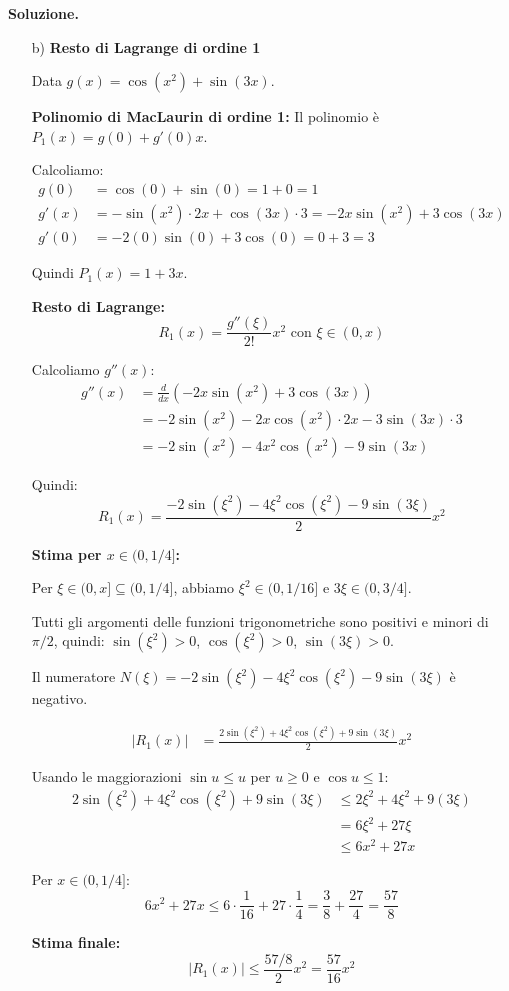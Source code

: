 \documentclass[12pt, a4paper]{article}
\newenvironment{solution}{%
    \par\noindent\textbf{Soluzione.}\medskip\par
    \normalfont
}{\par\bigskip}
\begin{document}
\begin{solution}
\begin{enumerate}
    \item[b)] \textbf{Resto di Lagrange di ordine 1}
    
    Data $g(x) = \cos(x^2) + \sin(3x)$.
    
    \textbf{Polinomio di MacLaurin di ordine 1:}
    Il polinomio è $P_1(x) = g(0) + g'(0)x$.
    
    Calcoliamo:
    \begin{align}
        g(0) &= \cos(0) + \sin(0) = 1 + 0 = 1 \\
        g'(x) &= -\sin(x^2) \cdot 2x + \cos(3x) \cdot 3 = -2x\sin(x^2) + 3\cos(3x) \\
        g'(0) &= -2(0)\sin(0) + 3\cos(0) = 0 + 3 = 3
    \end{align}
    
    Quindi $P_1(x) = 1 + 3x$.
    
    \textbf{Resto di Lagrange:}
    \[R_1(x) = \frac{g''(\xi)}{2!}x^2 \text{ con } \xi \in (0,x)\]
    
    Calcoliamo $g''(x)$:
    \begin{align}
        g''(x) &= \frac{d}{dx}(-2x\sin(x^2) + 3\cos(3x)) \\
        &= -2\sin(x^2) - 2x\cos(x^2) \cdot 2x - 3\sin(3x) \cdot 3 \\
        &= -2\sin(x^2) - 4x^2\cos(x^2) - 9\sin(3x)
    \end{align}
    
    Quindi:
    \[R_1(x) = \frac{-2\sin(\xi^2) - 4\xi^2\cos(\xi^2) - 9\sin(3\xi)}{2}x^2\]
    
    \textbf{Stima per $x \in (0, 1/4]$:}
    
    Per $\xi \in (0, x] \subseteq (0, 1/4]$, abbiamo $\xi^2 \in (0, 1/16]$ e $3\xi \in (0, 3/4]$.
    
    Tutti gli argomenti delle funzioni trigonometriche sono positivi e minori di $\pi/2$, quindi:
    $\sin(\xi^2) > 0$, $\cos(\xi^2) > 0$, $\sin(3\xi) > 0$.
    
    Il numeratore $N(\xi) = -2\sin(\xi^2) - 4\xi^2\cos(\xi^2) - 9\sin(3\xi)$ è negativo.
    
    \begin{align}
        |R_1(x)| &= \frac{2\sin(\xi^2) + 4\xi^2\cos(\xi^2) + 9\sin(3\xi)}{2}x^2
    \end{align}
    
    Usando le maggiorazioni $\sin u \leq u$ per $u \geq 0$ e $\cos u \leq 1$:
    \begin{align}
        2\sin(\xi^2) + 4\xi^2\cos(\xi^2) + 9\sin(3\xi) &\leq 2\xi^2 + 4\xi^2 + 9(3\xi) \\
        &= 6\xi^2 + 27\xi \\
        &\leq 6x^2 + 27x
    \end{align}
    
    Per $x \in (0, 1/4]$:
    \[6x^2 + 27x \leq 6 \cdot \frac{1}{16} + 27 \cdot \frac{1}{4} = \frac{3}{8} + \frac{27}{4} = \frac{57}{8}\]
    
    \textbf{Stima finale:}
    \[|R_1(x)| \leq \frac{57/8}{2}x^2 = \frac{57}{16}x^2\]
\end{enumerate}
\end{solution}
\end{document}
